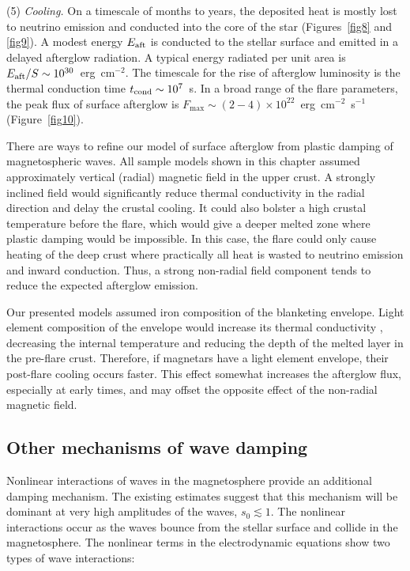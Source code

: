 (5) {\it Cooling.}
On a timescale of months to years, the deposited heat is mostly lost to neutrino emission and conducted into the core of the star (Figures~\ref{fig8} and \ref{fig9}). 
A modest energy $E_{\rm aft}$ is conducted to the stellar surface and emitted in a delayed afterglow radiation. 
A typical energy radiated per unit area is $E_{\rm aft}/S\sim 10^{30}$~erg~cm$^{-2}$.
The timescale for the rise of afterglow luminosity is the thermal conduction time $t_{\rm cond}\sim 10^7$~s. 
In a broad range of the flare parameters, the peak flux of surface afterglow is $F_{\max}\sim (2-4)\times 10^{22}$~erg~cm$^{-2}$~s$^{-1}$ (Figure~\ref{fig10}).

There are ways to refine our model of surface afterglow from plastic damping of magnetospheric waves. 
All sample models shown in this chapter assumed approximately vertical (radial) magnetic field in the upper crust. 
A strongly inclined field would significantly reduce thermal conductivity in the radial direction and delay the crustal cooling. 
It could also bolster a high crustal temperature before the flare, which would give a deeper melted zone where plastic damping would be impossible. 
In this case, the flare could only cause heating of the deep crust where practically all heat is wasted to neutrino emission and inward conduction. 
Thus, a strong non-radial field component tends to reduce the expected afterglow emission.

Our presented models assumed iron composition of the blanketing envelope. Light element composition of the envelope would increase its thermal conductivity \citep{2003ApJ...594..404P}, decreasing the internal temperature and reducing the depth of the melted layer in the pre-flare crust. 
Therefore, if magnetars have a light element envelope, their post-flare cooling occurs faster. 
This effect somewhat increases the afterglow flux, especially at early times, and may offset the opposite effect of the non-radial magnetic field.


\subsection{Other mechanisms of \alfven wave damping}

Nonlinear interactions of \alfven waves in the magnetosphere provide an additional damping mechanism. The existing estimates \citep{1998PhRvD..57.3219T} suggest that this mechanism will be dominant at very high amplitudes of the waves, $s_0\lesssim 1$.
The nonlinear interactions occur as the \alfven waves bounce from the stellar surface and collide in the magnetosphere. The nonlinear terms in the electrodynamic equations show two types of wave interactions: 

